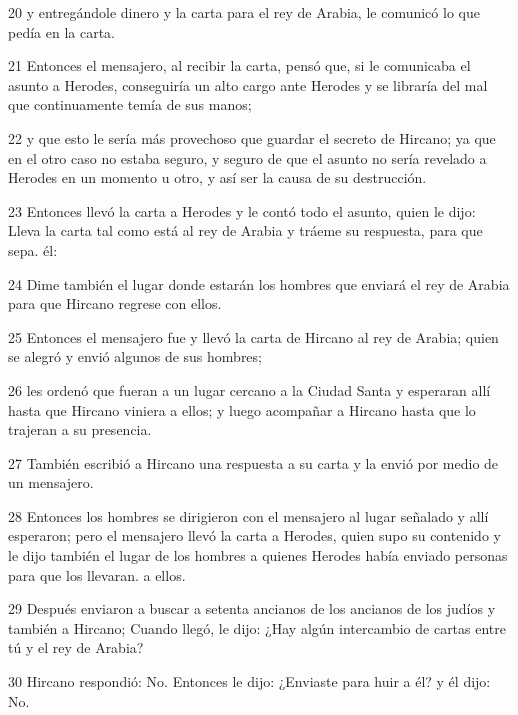 \par 20 y entregándole dinero y la carta para el rey de Arabia, le comunicó lo que pedía en la carta.

\par 21 Entonces el mensajero, al recibir la carta, pensó que, si le comunicaba el asunto a Herodes, conseguiría un alto cargo ante Herodes y se libraría del mal que continuamente temía de sus manos;

\par 22 y que esto le sería más provechoso que guardar el secreto de Hircano; ya que en el otro caso no estaba seguro, y seguro de que el asunto no sería revelado a Herodes en un momento u otro, y así ser la causa de su destrucción.

\par 23 Entonces llevó la carta a Herodes y le contó todo el asunto, quien le dijo: Lleva la carta tal como está al rey de Arabia y tráeme su respuesta, para que sepa. él:

\par 24 Dime también el lugar donde estarán los hombres que enviará el rey de Arabia para que Hircano regrese con ellos.

\par 25 Entonces el mensajero fue y llevó la carta de Hircano al rey de Arabia; quien se alegró y envió algunos de sus hombres;

\par 26 les ordenó que fueran a un lugar cercano a la Ciudad Santa y esperaran allí hasta que Hircano viniera a ellos; y luego acompañar a Hircano hasta que lo trajeran a su presencia.

\par 27 También escribió a Hircano una respuesta a su carta y la envió por medio de un mensajero.

\par 28 Entonces los hombres se dirigieron con el mensajero al lugar señalado y allí esperaron; pero el mensajero llevó la carta a Herodes, quien supo su contenido y le dijo también el lugar de los hombres a quienes Herodes había enviado personas para que los llevaran. a ellos.

\par 29 Después enviaron a buscar a setenta ancianos de los ancianos de los judíos y también a Hircano; Cuando llegó, le dijo: ¿Hay algún intercambio de cartas entre tú y el rey de Arabia?

\par 30 Hircano respondió: No. Entonces le dijo: ¿Enviaste para huir a él? y él dijo: No.

